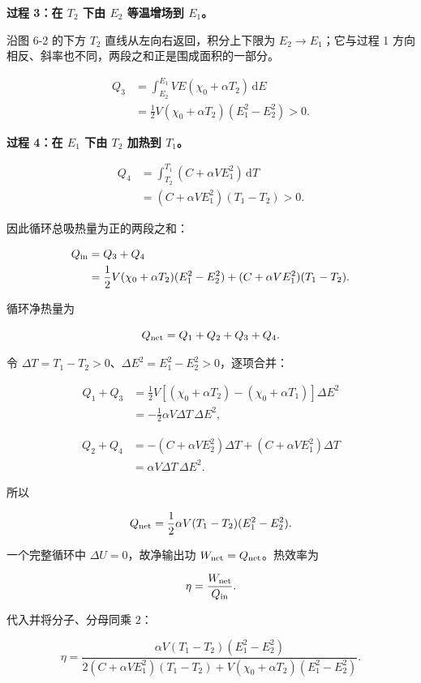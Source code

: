 \documentclass[12pt,a4paper,UTF8]{ctexart}
\begin{document}
\textbf{过程 3：在 \(T_2\) 下由 \(E_2\) 等温增场到 \(E_1\)。}

沿图 6-2 的下方 \(T_2\) 直线从左向右返回，积分上下限为
\(E_2\to E_1\)；它与过程 1
方向相反、斜率也不同，两段之和正是围成面积的一部分。

\[
\begin{aligned}
Q_3
&=\int_{E_2}^{E_1}VE(\chi_0+\alpha T_2)\,\mathrm dE\\
&=\frac12V(\chi_0+\alpha T_2)(E_1^2-E_2^2)>0.
\end{aligned}
\]

\textbf{过程 4：在 \(E_1\) 下由 \(T_2\) 加热到 \(T_1\)。}

\[
\begin{aligned}
Q_4
&=\int_{T_2}^{T_1}(C+\alpha VE_1^2)\,\mathrm dT\\
&=(C+\alpha VE_1^2)(T_1-T_2)>0.
\end{aligned}
\]

因此循环总吸热量为正的两段之和：

\[
\begin{aligned}
Q_{\rm in}
&=Q_3+Q_4\\
&=\frac12V(\chi_0+\alpha T_2)(E_1^2-E_2^2)
+(C+\alpha VE_1^2)(T_1-T_2).
\end{aligned}
\]

循环净热量为

\[Q_{\rm net}=Q_1+Q_2+Q_3+Q_4.\]

令 \(\Delta T=T_1-T_2>0\)、\(\Delta E^2=E_1^2-E_2^2>0\)，逐项合并：

\[
\begin{aligned}
Q_1+Q_3
&=\frac12V[(\chi_0+\alpha T_2)-(\chi_0+\alpha T_1)]\Delta E^2\\
&=-\frac12\alpha V\Delta T\,\Delta E^2,
\end{aligned}
\]

\[
\begin{aligned}
Q_2+Q_4
&=-(C+\alpha VE_2^2)\Delta T
+(C+\alpha VE_1^2)\Delta T\\
&=\alpha V\Delta T\,\Delta E^2.
\end{aligned}
\]

所以

\[Q_{\rm net}=\frac12\alpha V(T_1-T_2)(E_1^2-E_2^2).\]

一个完整循环中 \(\Delta U=0\)，故净输出功
\(W_{\rm net}=Q_{\rm net}\)。热效率为

\[
\eta=\frac{W_{\rm net}}{Q_{\rm in}}.
\]

代入并将分子、分母同乘 \(2\)：

\[
\boxed{
\eta=
\frac{\alpha V(T_1-T_2)(E_1^2-E_2^2)}
{2(C+\alpha VE_1^2)(T_1-T_2)
+V(\chi_0+\alpha T_2)(E_1^2-E_2^2)} }.
\]
\end{document}
